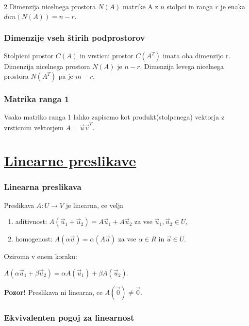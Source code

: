 \documentclass{article}
\begin{document}
\begin{multicols}{2}
	Dimenzija nicelnega prostora $N(A)$ matrike A z $n$ stolpci in ranga $r$
	je enaka $dim(N(A)) = n - r$.

	\subsubsection{Dimenzije vseh štirih podprostorov}

	Stolpicni prostor $C(A)$ in vrsticni prostor $C(A^{T})$ imata oba dimenzijo r. Dimenzija
	nicelnega prostora $N(A)$ je $n -r$, Dimenzija levega nicelnega prostora $N(A^{T})$ pa je $m - r$.

	\subsubsection{Matrika ranga 1}

	Vsako matriko ranga 1 lahko zapisemo kot produkt(stolpcnega) vektorja z vrsticnim
	vektorjem $A = \vec{u}\vec{v}^{T}$.

	\section{\underline{Linearne preslikave}}

	\subsubsection{Linearna preslikava}

	Preslikava $A: U \rightarrow V$ je linearna, ce velja
	\begin{enumerate}
		\item aditivnost: $A(\vec{u}_{1} + \vec{u}_{2}) = A\vec{u}_{1} + A\vec{u}_{2}$ za vse $\vec{u}_{1}, \vec{u}_{2} \in U$,
		\item homogenost: $A(\alpha \vec{u}) = \alpha(A\vec{u})$ za vse $\alpha \in R$ in $\vec{u} \in U$.
	\end{enumerate}
	Oziroma v enem koraku:
	\begin{center}
		\begin{math}
			A(\alpha\vec{u}_{1} + \beta\vec{u}_{2}) = \alpha A(\vec{u}_{1}) + \beta A(\vec{u}_{2}).
		\end{math}
	\end{center}
	\textbf{Pozor!} Preslikava ni linearna, ce $A(\vec{0}) \neq  \vec{0}$.

	\subsubsection{Ekvivalenten pogoj za linearnost}


\end{multicols}
\end{document}
